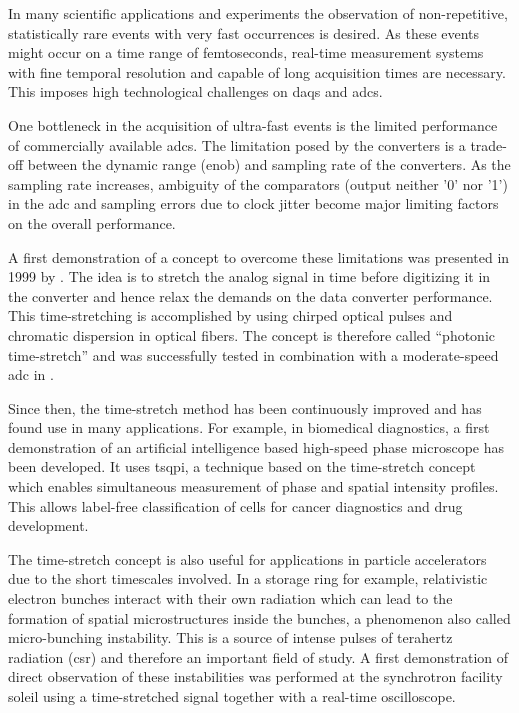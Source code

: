 In many scientific applications and experiments the observation of non-repetitive, statistically rare events with very fast occurrences is desired.
As these events might occur on a time range of femtoseconds, real-time measurement systems with fine temporal resolution and capable of long acquisition times are necessary.
This imposes high technological challenges on \glspl{daq} and \glspl{adc}.

One bottleneck in the acquisition of ultra-fast events is the limited performance of commercially available \glspl{adc}. 
The limitation posed by the converters is a trade-off between the dynamic range (\gls{enob}) and sampling rate of the converters.
As the sampling rate increases, ambiguity of the comparators (output neither '0' nor '1') in the \gls{adc} and sampling errors due to clock jitter become major limiting factors on the overall performance. \cite{Mahjoubfar2017}

A first demonstration of a concept to overcome these limitations was presented in 1999 by \cite{ts_adc}. 
The idea is to stretch the analog signal in time before digitizing it in the converter and hence relax the demands on the data converter performance. 
This time-stretching is accomplished by using chirped optical pulses and chromatic dispersion in optical fibers.
The concept is therefore called ``photonic time-stretch'' and was successfully tested in combination with a moderate-speed \gls{adc} in \cite{ts_adc}.

Since then, the time-stretch method has been continuously improved and has found use in many applications.
For example, in biomedical diagnostics, a first demonstration of an artificial intelligence based high-speed phase microscope has been developed. 
It uses \gls{tsqpi}, a technique based on the time-stretch concept which enables simultaneous measurement of phase and spatial intensity profiles.
This allows label-free classification of cells for cancer diagnostics and drug development. \cite{Mahjoubfar2017} 

The time-stretch concept is also useful for applications in particle accelerators due to the short timescales involved.
In a storage ring for example, relativistic electron bunches interact with their own radiation which can lead to the formation of spatial microstructures inside the bunches, a phenomenon also called micro-bunching instability.
This is a source of intense pulses of terahertz radiation (\gls{csr}) and therefore an important field of study. 
A first demonstration of direct observation of these instabilities was performed at the synchrotron facility \gls{soleil} using a time-stretched signal together with a real-time oscilloscope. \cite{Roussel2015}

